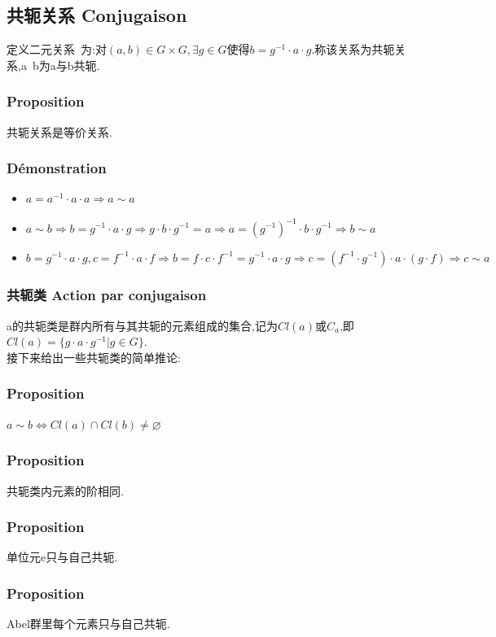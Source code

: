 \documentclass[12pt, a4paper, oneside]{ctexbook}
\begin{document}
  \subsection{共轭关系 Conjugaison}\label{myref:conjugaison}
  定义二元关系~为:对$(a,b)\in G\times G, \exists g\in G$使得$b=g^{-1}\cdot a\cdot g$.称该关系为共轭关系,a~b为a与b共轭.
  \subsubsection{Proposition}
  共轭关系是等价关系.
  \subsubsection{Démonstration}
  \begin{itemize}
    \item $a=a^{-1}\cdot a\cdot a\Rightarrow a\sim a$
    \item $a\sim b\Rightarrow b=g^{-1}\cdot a\cdot g\Rightarrow g\cdot b\cdot g^{-1}=a\Rightarrow a=(g^{-1})^{-1}\cdot b\cdot g^{-1}\Rightarrow b\sim a$
    \item $b=g^{-1}\cdot a\cdot g, c=f^{-1}\cdot a\cdot f\Rightarrow b=f\cdot c\cdot f^{-1}=g^{-1}\cdot a\cdot g\Rightarrow c=(f^{-1}\cdot g^{-1})\cdot a\cdot (g\cdot f)\Rightarrow c\sim a$
  \end{itemize}
  \subsubsection{共轭类 Action par conjugaison}
  a的共轭类是群内所有与其共轭的元素组成的集合,记为$Cl(a)$或$C_a$,即$Cl(a)=\{g\cdot a\cdot g^{-1}|g\in G\}$.\\

  接下来给出一些共轭类的简单推论:
  \subsubsection{Proposition}
  $a\sim b\Leftrightarrow Cl(a)\cap Cl(b)\neq \varnothing$
  \subsubsection{Proposition}
  共轭类内元素的阶相同.
  \subsubsection{Proposition}
  单位元e只与自己共轭.
  \subsubsection{Proposition}
  Abel群里每个元素只与自己共轭.
\end{document}

